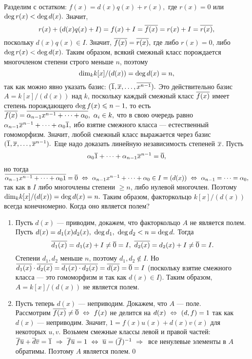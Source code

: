 Разделим с остатком: $f(x)=d(x)q(x)+r(x),$ где $r(x)=0$ или
${\rm deg}\, r(x)<{\rm deg}\, d(x).$ Значит,
$$r(x)+(d(x)q(x)+I)=f(x)+I=\overline{f(x)}=r(x)+I=\overline{r(x)},$$ поскольку
$d(x)q(x)\in I.$ Значит, $\overline{f(x)}=\overline{r(x)},$ где либо $r(x)=0$,
либо ${\rm deg}\, r(x)<{\rm deg}\, d(x).$ Таким образом, всякий
смежный класс порождается многочленом степени строго меньше $n$,
поэтому $${\rm dim}_k k[x]/(d(x))={\rm deg}\, d(x)=n,$$ так как
можно явно указать базис: $(\overline{1}, \overline{x}, \dots, \overline{x^{n-1}}).$
Это действительно базис $A=k[x]/(d(x))$ над $k$, поскольку каждый
смежный класс $\overline{f(x)}$ имеет степень порождающего ${\rm deg}\,
f(x)\leqslant n-1,$ то есть
$\ov{f(x)}=\ov{\alpha_{n-1}x^{n-1}+\dots+\alpha_0},\ \alpha_i\in
k,$ что в свою очередь равно $\alpha_{n-1}\overline{x}^{n-1}+\dots+\alpha_0\overline{1},$ ибо взятие смежного класса ---
естественный гомоморфизм. Значит, любой смежный класс выражается
через базис $(\overline{1}, \overline{x}, \dots, \overline{x}^{n-1}).$ Еще надо
доказать линейную независимость степеней $\overline{x}$. Пусть
$$\alpha_0\overline{1}+\dots+\alpha_{n-1}\overline{x}^{n-1}=\overline{0},$$ но тогда
$\overline{\alpha_{n-1}x^{n-1}+\dots+\alpha_01}=\overline{0}\ \Leftrightarrow\ 
\alpha_{n-1}x^{n-1}+\dots+\alpha_0\in I=(d(x))\ \Leftrightarrow\ 
\alpha_{n-1}=\dots=\alpha_0,$ так как в $I$ либо многочлены
степени $\ge n$, либо нулевой многочлен. Поэтому ${\rm dim}_k
k[x]/(d(x))={\rm deg}\, d(x)=n.$ Таким образом, факторкольцо
$k[x]/(d(x))$ всегда конечномерно. Когда оно является полем?

\dok \begin{enumerate} \item Пусть $d(x)$ --- приводим, докажем,
что факторкольцо $A$ не является полем.\\ Пусть
$d(x)=d_1(x)d_2(x),\ \rr{deg}\,d_1,\ \rr{deg}\,d_2<n=\deg d.$
 Тогда $$\overline{d_1(x)}=d_1(x)+I\ne\overline{0}=I,\
\overline{d_2(x)}=d_2(x)+I\ne\overline{0}=I.$$ Степени $d_1, d_2$ меньше $n$,
поэтому $d_1,d_2\notin I.$ Но
$\overline{d_1(x)}\cdot\overline{d_2(x)}=\overline{d_1(x)\cdot d_2(x)}=\overline{d(x)}=\overline{0}=I$ (поскольку взятие смежного класса --- это гомоморфизм и так
как $d(x)\in I$).
 Таким образом, $A=k[x]/(d(x))$ не является полем.
 \item Пусть теперь $d(x)$ --- неприводим. Докажем, что $A$ --- поле.\\
Рассмотрим $\overline{f(x)}\ne\overline{0}\ \Leftrightarrow\  f(x)$ не делится на $d(x)\ \Leftrightarrow\ 
(d, f)=1$ так как $d(x)$ --- неприводим. Значит,
$1=f(x)u(x)+d(x)v(x)$ для некоторых $u, v.$
Возьмем смежные классы
левой и правой частей: $\overline{f}\overline{u}+\overline{d}\overline{v}=\overline{1}\ \Rightarrow\  \overline{f}\overline{u}=1\ \Leftrightarrow\  \overline{u}=(\overline{f})^{-1}\ \Rightarrow\  $ все ненулевые элементы в $A$
обратимы.
    Поэтому $A$ является полем.\qquad\qed
\end{enumerate}

